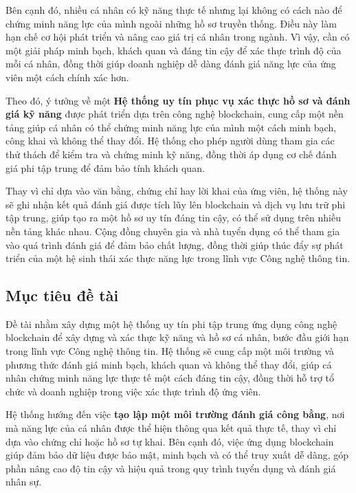 Bên cạnh đó, nhiều cá nhân có kỹ năng thực tế nhưng lại không có cách nào để chứng minh năng lực của mình ngoài những hồ sơ truyền thống.
Điều này làm hạn chế cơ hội phát triển và nâng cao giá trị cá nhân trong ngành.
Vì vậy, cần có một giải pháp minh bạch, khách quan và đáng tin cậy để xác thực trình độ của mỗi cá nhân,
đồng thời giúp doanh nghiệp dễ dàng đánh giá năng lực của ứng viên một cách chính xác hơn.

Theo đó, ý tưởng về một \textbf{Hệ thống uy tín phục vụ xác thực hồ sơ và đánh giá kỹ năng} được phát triển dựa trên công nghệ blockchain,
cung cấp một nền tảng giúp cá nhân có thể chứng minh năng lực của mình một cách minh bạch, công khai và không thể thay đổi.
Hệ thống cho phép người dùng tham gia các thử thách để kiểm tra và chứng minh kỹ năng, đồng thời áp dụng cơ chế đánh giá phi tập trung để đảm bảo tính khách quan.

Thay vì chỉ dựa vào văn bằng, chứng chỉ hay lời khai của ứng viên, hệ thống này sẽ ghi nhận kết quả đánh giá được tích lũy lên blockchain và dịch vụ lưu trữ phi tập trung,
giúp tạo ra một hồ sơ uy tín đáng tin cậy, có thể sử dụng trên nhiều nền tảng khác nhau.
Cộng đồng chuyên gia và nhà tuyển dụng có thể tham gia vào quá trình đánh giá để đảm bảo chất lượng,
đồng thời giúp thúc đẩy sự phát triển của một hệ sinh thái xác thực năng lực trong lĩnh vực Công nghệ thông tin.

\subsection*{\thesubsection\quad Mục tiêu đề tài}

Đề tài nhằm xây dựng một hệ thống uy tín phi tập trung ứng dụng công nghệ blockchain để xây dựng và xác thực kỹ năng và hồ sơ cá nhân, bước đầu giới hạn trong lĩnh vực Công nghệ thông tin.
Hệ thống sẽ cung cấp một môi trường và phương thức đánh giá minh bạch, khách quan và không thể thay đổi, giúp cá nhân chứng minh năng lực thực tế một cách đáng tin cậy,
đồng thời hỗ trợ tổ chức và doanh nghiệp trong việc xác thực trình độ ứng viên.

Hệ thống hướng đến việc \textbf{tạo lập một môi trường đánh giá công bằng}, nơi mà năng lực của cá nhân được thể hiện thông qua kết quả thực tế,
thay vì chỉ dựa vào chứng chỉ hoặc hồ sơ tự khai. Bên cạnh đó, việc ứng dụng blockchain giúp đảm bảo dữ liệu được bảo mật,
minh bạch và có thể truy xuất dễ dàng, góp phần nâng cao độ tin cậy và hiệu quả trong quy trình tuyển dụng và đánh giá nhân sự.

